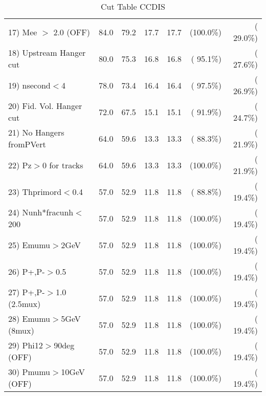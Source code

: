 \begin{table}[h!]
\begin{tabular}{||l||r|r|r|r|r|r||}
 17) Mee $>$ 2.0  (OFF)   &         84.0 &         79.2 &         17.7 &         17.7 & (100.0\%) & ( 29.0\%) \\
 18) Upstream Hanger cut  &         80.0 &         75.3 &         16.8 &         16.8 & ( 95.1\%) & ( 27.6\%) \\
 19) nsecond$<$4          &         78.0 &         73.4 &         16.4 &         16.4 & ( 97.5\%) & ( 26.9\%) \\
 20) Fid. Vol. Hanger cut &         72.0 &         67.5 &         15.1 &         15.1 & ( 91.9\%) & ( 24.7\%) \\
 21) No Hangers fromPVert &         64.0 &         59.6 &         13.3 &         13.3 & ( 88.3\%) & ( 21.9\%) \\
 22) Pz$>$0 for tracks    &         64.0 &         59.6 &         13.3 &         13.3 & (100.0\%) & ( 21.9\%) \\
 23) Thprimord$<$0.4      &         57.0 &         52.9 &         11.8 &         11.8 & ( 88.8\%) & ( 19.4\%) \\
 24) Nunh*fracunh$<$200   &         57.0 &         52.9 &         11.8 &         11.8 & (100.0\%) & ( 19.4\%) \\
 25) Emumu$>$2GeV         &         57.0 &         52.9 &         11.8 &         11.8 & (100.0\%) & ( 19.4\%) \\
 26) P+,P-$>$0.5          &         57.0 &         52.9 &         11.8 &         11.8 & (100.0\%) & ( 19.4\%) \\
 27) P+,P-$>$1.0 (2.5mux) &         57.0 &         52.9 &         11.8 &         11.8 & (100.0\%) & ( 19.4\%) \\
 28) Emumu$>$5GeV  (8mux) &         57.0 &         52.9 &         11.8 &         11.8 & (100.0\%) & ( 19.4\%) \\
 29) Phi12$>$90deg  (OFF) &         57.0 &         52.9 &         11.8 &         11.8 & (100.0\%) & ( 19.4\%) \\
 30) Pmumu$>$10GeV  (OFF) &         57.0 &         52.9 &         11.8 &         11.8 & (100.0\%) & ( 19.4\%) \\
 \hline
 \hline
 \end{tabular}
 \caption{Cut Table  CCDIS    }
 \label{tab-cutcohjpsi-mumu_ncdis}
 \end{table}
